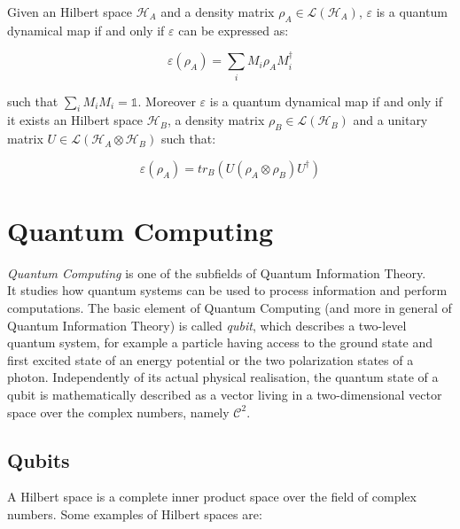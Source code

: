 \begin{theorem}
    Given an Hilbert space $\mathcal{H}_A$ and a density matrix $\rho_A \in \mathcal{L}(\mathcal{H}_A)$, $\varepsilon$ is a quantum dynamical map if and 
    only if $\varepsilon$ can be expressed as:

\begin{equation}
    \varepsilon(\rho_A) = \sum_i M_i \rho_A M_i^{\dagger} 
\end{equation}

such that $\sum_i M_i M_i = \mathds{1}$.
Moreover $\varepsilon$ is a quantum dynamical map if and only if it exists an Hilbert space $\mathcal{H}_B$, a density matrix 
$\rho_B \in \mathcal{L}(\mathcal{H}_B)$ and a unitary matrix $U \in \mathcal{L}(\mathcal{H}_A \otimes \mathcal{H}_B)$ such that:

\begin{equation}
    \varepsilon(\rho_A) = tr_B(U(\rho_A \otimes \rho_B)U^{\dagger})
\end{equation}


\end{theorem}



\section{Quantum Computing}

\textit{Quantum Computing} is one of the subfields of Quantum Information Theory.\\
It studies how quantum systems can be used to process information and perform computations.
The basic element of Quantum Computing (and more in general of Quantum Information Theory) is called \textit{qubit}, which describes a two-level quantum 
system, for example a particle having access to the ground state and first excited state of an energy potential or the two polarization states of a photon.
Independently of its actual physical realisation, the quantum state of a qubit is mathematically described as a vector living 
in a two-dimensional vector space over the complex numbers, namely $\mathcal{C}^2$.


\subsection{Qubits}

A Hilbert space is a complete inner product space over the field of complex numbers.
Some examples of Hilbert spaces are:

